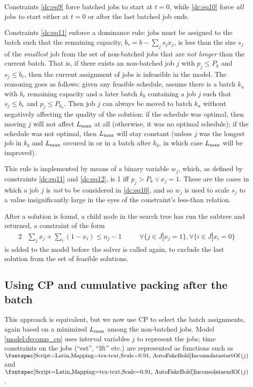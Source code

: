 \documentclass[13pt, letterpaper, oneside]{book}
\begin{document}
Constraints \eqref{dc:eq9} force batched jobs to start at $t = 0$, while
\eqref{dc:eq10} force \textit{all} jobs to start either at $t = 0$ or after the
last batched job ends.

Constraints \eqref{dc:eq11} enforce a dominance rule: jobs must be assigned to
the batch such that the remaining capacity, $b_r = b - \sum_j s_j x_j$, is less
than the size $s_j$ of the \textit{smallest} job from the set of non-batched
jobs that are \textit{not longer} than the current batch. That is, if there
exists an non-batched job $j$ with $p_j \leq P_k$ and $s_j \leq b_r$, then the
current assignment of jobs is infeasible in the model. The reasoning goes as
follows: given any feasible schedule, assume there is a batch $k_a$ with $b_r$
remaining capacity and a later batch $k_b$ containing a job $j$ such that $s_j
\leq b_r$ and $p_j \leq P_{k_a}$. Then job $j$ can always be moved to batch
$k_a$ without negatively affecting the quality of the solution: if the schedule
was optimal, then moving $j$ will not affect $L_{\text{max}}$ at all (otherwise, it was
no optimal schedule); if the schedule was not optimal, then $L_{\text{max}}$ will stay
constant (unless $j$ was the longest job in $k_b$ and $L_{\text{max}}$ occured in or in a
batch after $k_b$, in which case $L_{\text{max}}$ will be improved).

This rule is implemented by means of a binary variable $w_j$, which, as defined
by constraints \eqref{dc:eq11} and \eqref{dc:eq12}, is 1 iff $p_j > P_k \lor x_j
= 1$. These are the cases in which a job $j$ is \textit{not} to be considered in
\eqref{dc:eq10}, and so $w_j$ is used to scale $s_j$ to a value insignificantly
large in the eyes of the constraint's less-than relation.

After a solution is found, a child node in the search tree has run the subtree
and returned, a constraint of the form 
\begin{alignat}{2}
& \sum_j x_j + \sum_i (1-x_i) \leq n_j - 1 \quad && \forall \{j \in J | x_j =
1\}, \forall \{i \in J | x_i = 0 \}
\end{alignat}
is added to the model before the solver is called again, to exclude the last
solution from the set of feasible solutions. 

\subsection{Using CP and cumulative packing after the
batch}\label{sec:cpdecomp}
This approach is equivalent, but we now use CP to select the batch assignments,
again based on a minimized $L_{\text{max}}$ among the non-batched jobs. Model
\ref{model:decomp_cp} uses interval variables $j$ to represent the jobs;
time constraints on the jobs (``est'', ``lft'' etc.) are represented as
functions such as $\startOf(j)$ and $\endOf(j)$.
\end{document}
